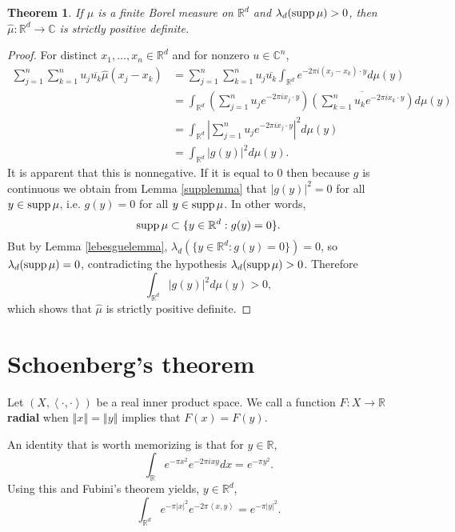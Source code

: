 \documentclass{article}
\newcommand{\inner}[2]{\left\langle #1, #2 \right\rangle}
\newcommand{\supp}{\ensuremath\mathrm{supp}\,}
\newcommand{\norm}[1]{\left\Vert #1 \right\Vert}
\newtheorem{theorem}{Theorem}
\theoremstyle{definition}
\begin{document}
\begin{theorem}
If $\mu$ is a finite Borel measure on $\mathbb{R}^d$ and $\lambda_d(\supp \mu)>0$, then 
$\hat{\mu}:\mathbb{R}^d \to \mathbb{C}$ is strictly positive definite.
\label{fourier}
\end{theorem} 
\begin{proof}
For distinct $x_1,\ldots,x_n \in \mathbb{R}^d$ and for nonzero $u \in \mathbb{C}^n$, 
\begin{align*}
\sum_{j=1}^n \sum_{k=1}^n u_j \overline{u_k} \hat{\mu}(x_j-x_k)&=
\sum_{j=1}^n \sum_{k=1}^n u_j \overline{u_k} \int_{\mathbb{R}^d} e^{-2\pi i(x_j-x_k)\cdot y} d\mu(y)\\
&=\int_{\mathbb{R}^d} \left(\sum_{j=1}^n u_j e^{-2\pi ix_j\cdot y} \right) \overline{\left( \sum_{k=1}^n u_k e^{-2\pi ix_k\cdot y} \right)} d\mu(y)\\
&=\int_{\mathbb{R}^d} \left| \sum_{j=1}^n u_j e^{-2\pi ix_j\cdot y} \right|^2 d\mu(y)\\
&=\int_{\mathbb{R}^d} |g(y)|^2 d\mu(y).
\end{align*}
It is apparent that this is nonnegative. If it is equal to $0$ then because $g$ is continuous we obtain from Lemma \ref{supplemma}
that 
$|g(y)|^2=0$ for all $y \in \supp \mu$, i.e.
$g(y)=0$ for all $y \in \supp \mu$. In other words,
\[
\supp \mu \subset \{y \in \mathbb{R}^d: g(y)=0\}.
\]
But by Lemma \ref{lebesguelemma}, $\lambda_d(\{y \in \mathbb{R}^d: g(y)=0\})=0$, so $\lambda_d(\supp \mu)=0$,
contradicting the hypothesis $\lambda_d(\supp \mu)>0$. Therefore
\[
\int_{\mathbb{R}^d} |g(y)|^2 d\mu(y)>0,
\]
which shows that $\hat{\mu}$ is strictly positive definite.
\end{proof}


\section{Schoenberg's  theorem}
Let $(X,\inner{\cdot}{\cdot})$ be a real  inner product space. We call a function $F:X \to \mathbb{R}$ \textbf{radial} when 
$\norm{x}=\norm{y}$ implies that $F(x)=F(y)$. 


An identity that is worth memorizing is that for $y \in \mathbb{R}$,
\[
\int_{\mathbb{R}} e^{-\pi x^2} e^{-2\pi ixy} dx = e^{-\pi y^2}.
\]
Using this and Fubini's theorem yields,
 $y \in \mathbb{R}^d$,
\[
\int_{\mathbb{R}^d} e^{-\pi |x|^2} e^{-2\pi \inner{x}{y}} = e^{-\pi |y|^2}.
\]
\end{document}
